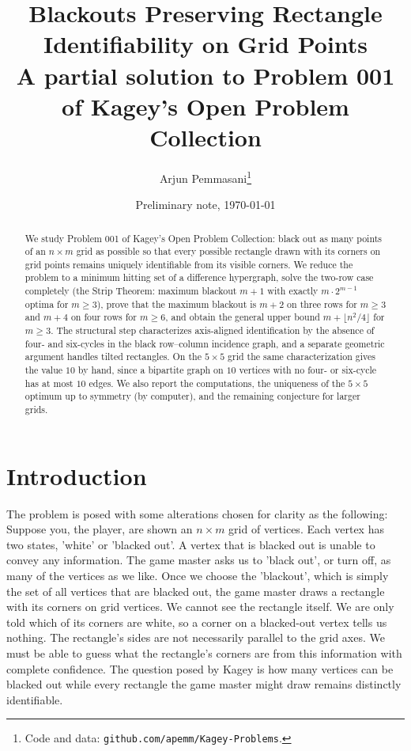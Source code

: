 \documentclass[12pt]{article}
\title{Blackouts Preserving Rectangle Identifiability on Grid Points\\
\large A partial solution to Problem 001 of Kagey's Open Problem Collection}
\author{Arjun Pemmasani\thanks{Code and data:
\texttt{github.com/apemm/Kagey-Problems}.}}
\date{Preliminary note, \today}
\theoremstyle{definition}\newtheorem{definition}{Definition}
\theoremstyle{remark}\newtheorem{remark}{Remark}
\begin{document}
\maketitle

\begin{abstract}
We study Problem 001 of Kagey's Open Problem Collection: black out as many points of an
$n\times m$ grid as possible so that every possible rectangle drawn with its corners on grid points remains
uniquely identifiable from its visible corners. We reduce the problem to a minimum
hitting set of a difference hypergraph, solve the two-row case completely (the Strip
Theorem: maximum blackout $m+1$ with exactly $m\cdot 2^{m-1}$ optima for $m\ge 3$),
prove that the maximum blackout is $m+2$ on three rows for $m\ge3$ and $m+4$ on
four rows for $m\ge6$, and obtain the general upper bound
$m+\lfloor n^2/4\rfloor$ for $m\ge3$. The structural step characterizes
axis-aligned identification by the absence of four- and six-cycles in the black
row--column incidence graph, and a separate geometric argument handles tilted rectangles.
On the $5\times5$ grid the same characterization gives the value $10$ by hand,
since a bipartite graph on $10$ vertices with no four- or six-cycle has at most $10$ edges.
We also report the computations, the uniqueness of the $5\times5$ optimum up to
symmetry (by computer), and the remaining conjecture for larger grids.
\end{abstract}

\section{Introduction}
The problem is posed with some alterations chosen for clarity as the following: Suppose you, the player, are shown an $n \times m$ grid of vertices. Each vertex has two states, 'white' or 'blacked out'. A vertex that is blacked out is unable to convey any information. The game master asks us to 'black out', or turn off, as many of the vertices as we like. Once we choose the 'blackout', which is simply the set of all vertices that are blacked out, the game master draws a rectangle with its corners on grid vertices. We cannot see the rectangle itself. We are only told which of its corners are white, so a corner on a blacked-out vertex tells us nothing. The rectangle's sides are not necessarily parallel to the grid axes. We must be able to guess what the rectangle's corners are from this information with complete confidence. The question posed by Kagey \cite{kagey} is how many vertices can be blacked out while every rectangle the game master might draw remains distinctly identifiable. 
\end{document}
